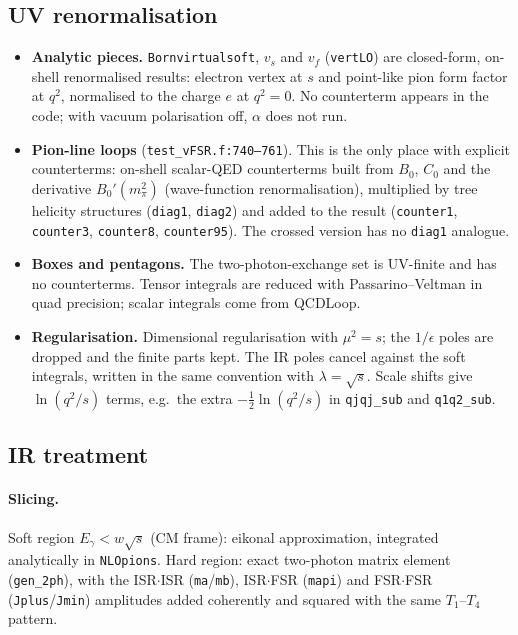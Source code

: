 \documentclass[11pt,a4paper]{article}
\newcommand{\code}[1]{\texttt{#1}}
\begin{document}
\subsection{UV renormalisation}
\label{sec:phok-uv}
\begin{itemize}
\item \textbf{Analytic pieces.} \code{Bornvirtualsoft}, $v_s$ and $v_f$ (\code{vertLO}) are
  closed-form, on-shell renormalised results: electron vertex at $s$ and point-like pion form
  factor at $q^2$, normalised to the charge $e$ at $q^2=0$. No counterterm appears in the code;
  with vacuum polarisation off, $\alpha$ does not run.
\item \textbf{Pion-line loops} (\code{test\_vFSR.f:740--761}). This is the only place with
  explicit counterterms: on-shell scalar-QED counterterms built from $B_0$, $C_0$ and the
  derivative $B_0'(m_\pi^2)$ (wave-function renormalisation), multiplied by tree helicity
  structures (\code{diag1}, \code{diag2}) and added to the result
  (\code{counter1}, \code{counter3}, \code{counter8}, \code{counter95}). The crossed version has
  no \code{diag1} analogue.
\item \textbf{Boxes and pentagons.} The two-photon-exchange set is UV-finite and has no
  counterterms. Tensor integrals are reduced with Passarino--Veltman in quad precision; scalar
  integrals come from QCDLoop.
\item \textbf{Regularisation.} Dimensional regularisation with $\mu^2=s$; the $1/\epsilon$
  poles are dropped and the finite parts kept. The IR poles cancel against the soft integrals,
  written in the same convention with $\lambda=\sqrt s$. Scale shifts give $\ln(q^2/s)$ terms,
  e.g.\ the extra $-\tfrac12\ln(q^2/s)$ in \code{qjqj\_sub} and \code{q1q2\_sub}.
\end{itemize}

\subsection{IR treatment}
\label{sec:phok-ir}

\paragraph{Slicing.} Soft region $E_\gamma<w\sqrt s$ (CM frame): eikonal approximation,
integrated analytically in \code{NLOpions}. Hard region: exact two-photon matrix element
(\code{gen\_2ph}), with the ISR$\cdot$ISR (\code{ma}/\code{mb}), ISR$\cdot$FSR (\code{mapi}) and
FSR$\cdot$FSR (\code{Jplus}/\code{Jmin}) amplitudes added coherently and squared with the same
$T_1$--$T_4$ pattern.
\end{document}
